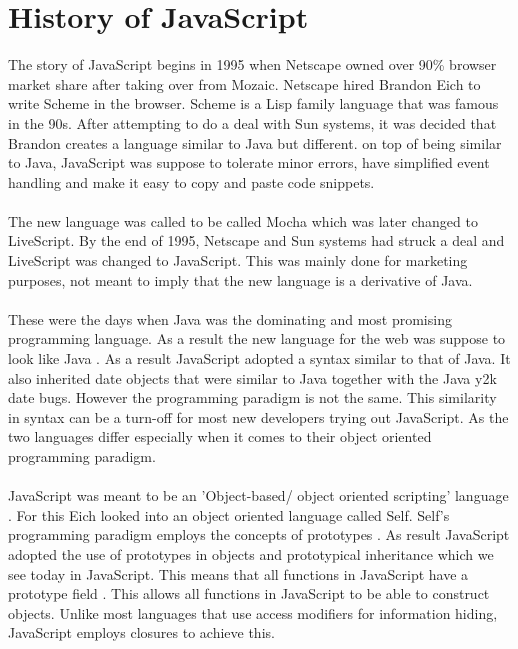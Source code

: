 \section{History of JavaScript}
The story of JavaScript begins in 1995 when Netscape owned over 90\% browser market share after taking over from Mozaic. Netscape hired Brandon Eich to write Scheme in the browser. Scheme is a Lisp family language that was famous in the 90s\cite{findler_c}. After attempting to do a deal with Sun systems, it was decided that Brandon creates a language similar to Java but different. on top of being similar to Java, JavaScript was suppose to tolerate minor errors, have simplified event handling and make it easy to copy and paste code snippets.
\paragraph{}
The new language was called to be called Mocha which was later changed to LiveScript. By the end of 1995, Netscape and Sun systems had struck a deal and LiveScript was changed to JavaScript\cite{JS}. This was mainly done for marketing purposes, not meant to imply that the new language is a derivative of Java\cite{JS}. 
\paragraph{}
These were the days when Java was the dominating and most promising programming language. As a result the new language for the web was suppose to look like Java \cite{JS}. As a result JavaScript adopted a syntax similar to that of Java. It also inherited date objects that were similar to Java together with the Java y2k date bugs\cite{Eich:2005:JTY:1090189.1086382}. However the programming paradigm is not the same. This similarity in syntax can be a turn-off for most new developers trying out JavaScript. As the two languages differ especially when it comes to their object oriented programming paradigm.
\paragraph{}
JavaScript was meant to be an 'Object-based/ object oriented scripting' language \cite{Eich:2005:JTY:1090189.1086382}. For this Eich looked into an object oriented language called Self. Self's programming paradigm employs the concepts of prototypes \cite{Ungar:1987:SPS:38807.38828}. As result JavaScript adopted the use of prototypes in objects and prototypical inheritance which we see today in JavaScript. This means that all functions in JavaScript have a prototype field \cite{Eich:2005:JTY:1090189.1086382}. This allows all functions in JavaScript to be able to construct objects. Unlike most languages that use access modifiers for information hiding, JavaScript employs closures to achieve this.
